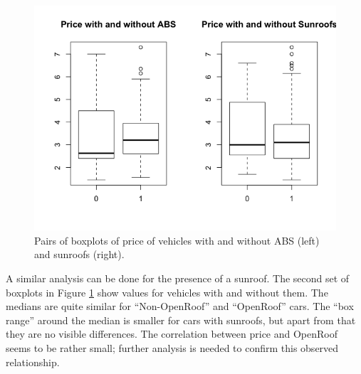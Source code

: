 \begin{figure}[H]
  \begin{center}
    \includegraphics[scale=0.5]{./img/bxps.png}
    \end{center}
  \caption{Pairs of boxplots of price of vehicles with and without ABS (left) and sunroofs (right).}
  \label{fig:Bxps}
\end{figure}

\noindent
A similar analysis can be done for the presence of a sunroof. The second set of boxplots in Figure \ref{fig:Bxps} show values for vehicles with and without them. The medians are quite similar for ``Non-OpenRoof'' and ``OpenRoof'' cars. The ``box range'' around the median is smaller for cars with sunroofs, but apart from that they are no visible differences. The correlation between price and OpenRoof seems to be rather small; further analysis is needed to confirm this observed relationship.



